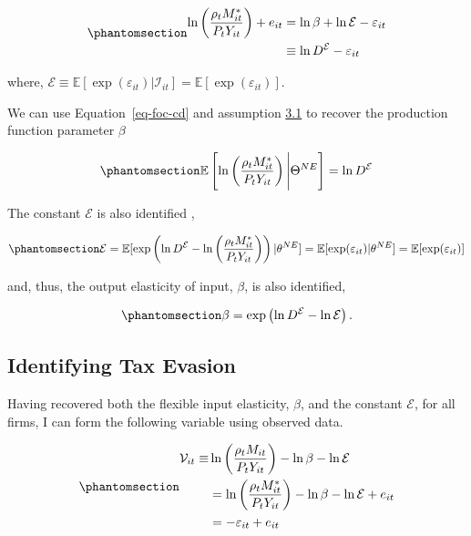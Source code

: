 \documentclass[
  12pt]{article}
\begin{document}
\begin{equation}\phantomsection\label{eq-foc-cd}{
\begin{aligned}
    \ln\left(\frac{\rho_t M^*_{it}}{P_{t}Y_{it}}\right)+e_{it}&=\ln\beta + \ln \mathcal{E}- \varepsilon_{it} \\
    &\equiv \ln D^{\mathcal{E}}- \varepsilon_{it} 
\end{aligned}
}\end{equation}

where,
\(\mathcal{E}\equiv \mathbb{E}[\exp(\varepsilon_{it})|\mathcal{I}_{it}]=\mathbb{E}[\exp(\varepsilon_{it})]\).

We can use Equation~\ref{eq-foc-cd} and assumption
\hyperref[ass-non-ev]{3.1} to recover the production function parameter
\(\beta\)

\begin{equation}\phantomsection\label{eq-foc-cd-exp}{
    \mathbb{E}\left[\ln\left(\frac{\rho_t M^*_{it}}{P_{t}Y_{it}}\right)\Bigg| \Theta^{NE}\right]=\ln D^{\mathcal{E}}
}\end{equation}

The constant \(\mathcal{E}\) is also identified \citep{Gandhi2020},

\begin{equation}\phantomsection\label{eq-id-E}{
\mathcal{E}=\mathbb{E}[\exp\left(\ln D^{\mathcal{E}}- \ln\left(\frac{\rho_t M^*_{it}}{P_{t}Y_{it}}\right)\right)|\theta^{NE}]=\mathbb{E}[\exp(\varepsilon_{it})|\theta^{NE}]=\mathbb{E}[\exp(\varepsilon_{it})]
}\end{equation}

and, thus, the output elasticity of input, \(\beta\), is also
identified,

\begin{equation}\phantomsection\label{eq-id-beta}{
\beta=\exp\left(\ln D^{\mathcal{E}}-\ln\mathcal{E}\right).
}\end{equation}

\subsection{Identifying Tax Evasion}\label{identifying-tax-evasion}

Having recovered both the flexible input elasticity, \(\beta\), and the
constant \(\mathcal{E}\), for all firms, I can form the following
variable using observed data.

\begin{equation}\phantomsection\label{eq-ob-ev}{
\begin{aligned}
    \mathcal V_{it}\equiv&\ln\left(\frac{\rho_t M_{it}}{P_{t}Y_{it}}\right)-\ln\beta -\ln\mathcal{E}\notag \\
    &=\ln\left(\frac{\rho_tM^*_{it}}{P_{t}Y_{it}}\right)-\ln\beta-\ln\mathcal{E}+e_{it} \notag \\
    &=-\varepsilon_{it} +e_{it}
\end{aligned}
}\end{equation}
\end{document}
